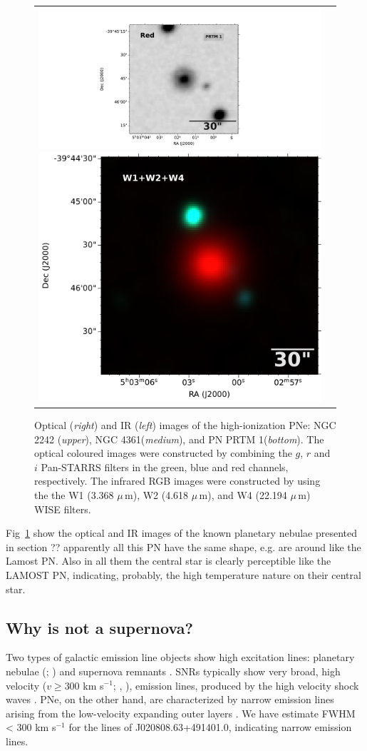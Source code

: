 \documentclass[fleqn,usenatbib]{mnras}
\begin{document}
\begin{figure}
\begin{tabular}{l l}
\includegraphics[width=0.535\linewidth, trim=280 10 330 10, clip]{Figs/dss_search_red.pdf}
\includegraphics[width=0.47\linewidth, trim=58 0 0 0]{Figs/0754m394_ac51-w4-int-3_ra75.75721626934_dec-39.76236833917_asec150.000-421-RGB.pdf}\\

\end{tabular}  
  \caption{Optical (\textit{right}) and IR (\textit{left}) images of the 
    high-ionization PNe: NGC 2242 (\textit{upper}),  NGC 4361(\textit{medium}), and
    PN PRTM 1(\textit{bottom}).
    The optical coloured images were constructed by combining the
    $g$, $r$ and $i$ Pan-STARRS filters in the green, blue and red channels, respectively.
  The infrared RGB images were constructed by using the the W1 (3.368 $\mu$\,m), W2 (4.618 $\mu$\,m), and W4 (22.194 $\mu$\,m) WISE filters.} 
  \label{fig:images-known}
\end{figure}

Fig~\ref{fig:images-known} show the optical and IR images of the known planetary nebulae
presented in section ?? apparently all this PN have the same shape, e.g. are around like
the Lamost PN. Also in all them the central star is clearly perceptible like the LAMOST PN,
indicating, probably, the high temperature nature on their central star.

\subsection{Why is not a supernova?}
\label{sec:snr}

Two types of galactic emission line objects show high excitation
lines: planetary nebulae (\citealp{Bernard:2009}; \citealp{Guiles:2007})
and supernova remnants \citep{Sandstrom:2009, Ghavamian:2009}.
SNRs typically show very broad, high velocity ($v \geq 300$ km s$^{-1}$;
\citealp{Oliveira:2011}, \citealp{Fesen:2010}), emission lines,  produced by the
high velocity shock waves \citep{Fesen:1985, Fesen:1996, Stupar:2007}. 
PNe, on the other hand, are characterized by narrow emission lines
arising from the low-velocity expanding outer layers \citep{Balick:2002, Gorny:2009}.
We have estimate FWHM < 300 km s$^{-1}$ for the lines of J020808.63+491401.0, indicating
narrow emission lines.
\end{document}
